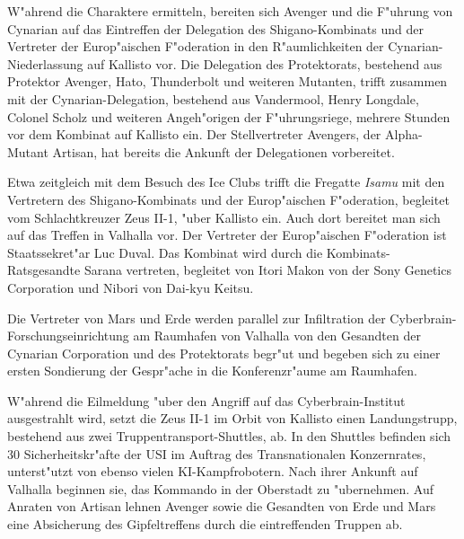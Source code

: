 
W"ahrend die Charaktere ermitteln, bereiten sich Avenger und die F"uhrung von Cynarian auf das Eintreffen der Delegation des Shigano-Kombinats und der Vertreter der Europ"aischen F"oderation in den R"aumlichkeiten der Cynarian-Niederlassung auf Kallisto vor. Die Delegation des Protektorats, bestehend aus Protektor Avenger, Hato, Thunderbolt und weiteren Mutanten, trifft zusammen mit der Cynarian-Delegation, bestehend aus Vandermool, Henry Longdale, Colonel Scholz und weiteren Angeh"origen der F"uhrungsriege, mehrere Stunden vor dem Kombinat auf Kallisto ein. Der Stellvertreter Avengers, der Alpha-Mutant Artisan, hat bereits die Ankunft der Delegationen vorbereitet.

Etwa zeitgleich mit dem Besuch des Ice Clubs trifft die Fregatte \emph{Isamu} mit den Vertretern des Shigano-Kombinats und der Europ"aischen F"oderation, begleitet vom Schlachtkreuzer Zeus II-1, "uber Kallisto ein. Auch dort bereitet man sich auf das Treffen in Valhalla vor. Der Vertreter der Europ"aischen F"oderation ist Staatssekret"ar Luc Duval. Das Kombinat wird durch die Kombinats-Ratsgesandte Sarana vertreten, begleitet von Itori Makon von der Sony Genetics Corporation und Nibori von Dai-kyu Keitsu.

Die Vertreter von Mars und Erde werden parallel zur Infiltration der Cyberbrain-Forschungseinrichtung am Raumhafen von Valhalla von den Gesandten der Cynarian Corporation und des Protektorats begr"u\3t und begeben sich zu einer ersten Sondierung der Gespr"ache in die Konferenzr"aume am Raumhafen.



W"ahrend die Eilmeldung "uber den Angriff auf das Cyberbrain-Institut ausgestrahlt wird, setzt die Zeus II-1 im Orbit von Kallisto einen Landungstrupp, bestehend aus zwei Truppentransport-Shuttles, ab. In den Shuttles befinden sich 30 Sicherheitskr"afte der USI im Auftrag des Transnationalen Konzernrates, unterst"utzt von ebenso vielen KI-Kampfrobotern. Nach ihrer Ankunft auf Valhalla beginnen sie, das Kommando in der Oberstadt zu "ubernehmen. Auf Anraten von Artisan lehnen Avenger sowie die Gesandten von Erde und Mars eine Absicherung des Gipfeltreffens durch die eintreffenden Truppen ab.

